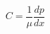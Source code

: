 \documentclass[preview,border=2pt]{standalone}
\begin{document}
\[
C = \frac{1}{\mu}\frac{dp}{dx}
\]
\end{document}
